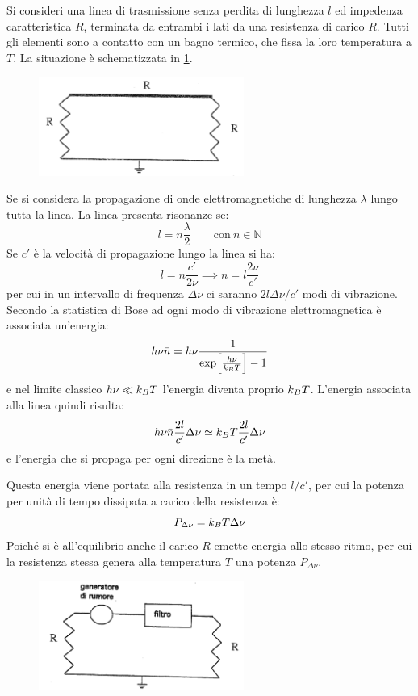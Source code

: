 Si consideri una linea di trasmissione senza perdita di lunghezza $ l $ ed impedenza caratteristica $ R $, terminata da entrambi i lati da una resistenza di carico $ R $.
Tutti gli elementi sono a contatto con un bagno termico, che fissa la loro temperatura a $ T $. La situazione è schematizzata in \cref{fig:nyqline}.

\begin{figure}[b]
	\centering
	\includegraphics[width=0.6\textwidth]{Immagini/NyquistLine.png}
	\vspace{-10pt}
	\caption{}
	\label{fig:nyqline}
	\vspace{-10pt}
\end{figure}

Se si considera la propagazione di onde elettromagnetiche di lunghezza $ \lambda $ lungo tutta la linea. La linea presenta risonanze se:
\[ l = n \frac{\lambda}{2} \qquad \text{con}~n \in \mathbb{N} \]
Se $ c' $ è la velocità di propagazione lungo la linea si ha:
\[ l = n \frac{c'}{2 \nu} \implies n = l \frac{2\nu}{c'} \]
per cui in un intervallo di frequenza $ \Delta \nu $ ci saranno $ 2l \Delta \nu /c' $ modi di vibrazione.
Secondo la statistica di Bose ad ogni modo di vibrazione elettromagnetica è associata un'energia:
\[ h\nu \bar{n} = h \nu \frac{1}{\exp[\frac{h\nu}{k_B T}] - 1} \]
e nel limite classico $ h\nu \ll k_B T $ l'energia diventa proprio $ k_B T $. L'energia associata alla linea quindi risulta:
\[ h\nu \bar{n} \frac{2l}{c'} \Delta\nu \simeq k_B T \frac{2l}{c'} \Delta\nu \]
e l'energia che si propaga per ogni direzione è la metà.

Questa energia viene portata alla resistenza in un tempo $ l/c' $, per cui la potenza per unità di tempo dissipata a carico della resistenza è:
\[ P_{\Delta\nu} = k_B T \Delta\nu \]
Poiché si è all'equilibrio anche il carico $ R $ emette energia allo stesso ritmo, per cui la resistenza stessa genera alla temperatura $ T $ una potenza $ P_{\Delta\nu} $.

\begin{figure}[t]
	\centering
	\includegraphics[width=0.6\textwidth]{Immagini/NyquistNoiseGenerator.png}
	\vspace{-5pt}
	\caption{}
	\label{fig:nyqgen}
	\vspace{-10pt}
\end{figure}

